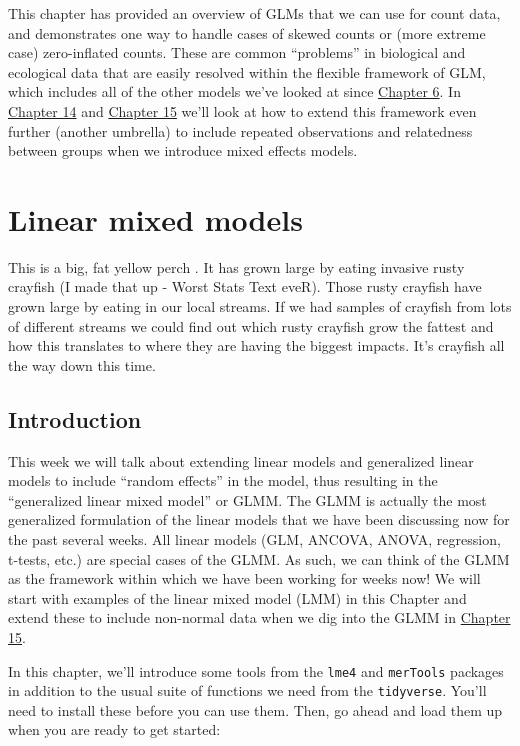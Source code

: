 \documentclass[
]{book}
\begin{document}
This chapter has provided an overview of GLMs that we can use for count data, and demonstrates one way to handle cases of skewed counts or (more extreme case) zero-inflated counts. These are common ``problems'' in biological and ecological data that are easily resolved within the flexible framework of GLM, which includes all of the other models we've looked at since \protect\hyperlink{Chapter6}{Chapter 6}. In \protect\hyperlink{Chapter14}{Chapter 14} and \protect\hyperlink{Chapter15}{Chapter 15} we'll look at how to extend this framework even further (another umbrella) to include repeated observations and relatedness between groups when we introduce mixed effects models.

\hypertarget{Chapter14}{%
\chapter{Linear mixed models}\label{Chapter14}}

This is a big, fat yellow perch . It has grown large by eating invasive rusty crayfish (I made that up - Worst Stats Text eveR). Those rusty crayfish have grown large by eating in our local streams. If we had samples of crayfish from lots of different streams we could find out which rusty crayfish grow the fattest and how this translates to where they are having the biggest impacts. It's crayfish all the way down this time.

\hypertarget{intro-14}{%
\section{Introduction}\label{intro-14}}

This week we will talk about extending linear models and generalized linear models to include ``random effects'' in the model, thus resulting in the ``generalized linear mixed model'' or GLMM. The GLMM is actually the most generalized formulation of the linear models that we have been discussing now for the past several weeks. All linear models (GLM, ANCOVA, ANOVA, regression, t-tests, etc.) are special cases of the GLMM. As such, we can think of the GLMM as the framework within which we have been working for weeks now! We will start with examples of the linear mixed model (LMM) in this Chapter and extend these to include non-normal data when we dig into the GLMM in \protect\hyperlink{Chapter15}{Chapter 15}.

In this chapter, we'll introduce some tools from the \texttt{lme4} and \texttt{merTools} packages in addition to the usual suite of functions we need from the \texttt{tidyverse}. You'll need to install these before you can use them. Then, go ahead and load them up when you are ready to get started:
\end{document}
